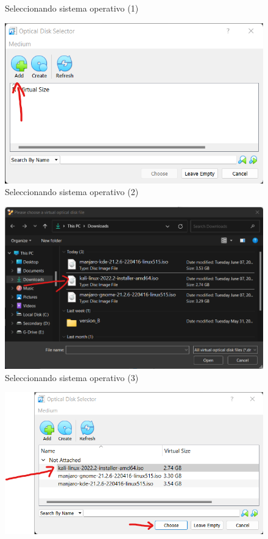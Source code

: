 \documentclass[stu, 12pt, letterpaper, donotrepeattitle, floatsintext, natbib, helv]{apa7}
\begin{document}
\begin{enumerate}
\begin{figure} [H]
        \caption{Seleccionando sistema operativo (1)}
        \label{fig:Select1}
    \end{figure}
    \begin{figure} [H]
        \includegraphics[width = 1\textwidth]{SelectingISO2.png}
        \caption{Seleccionando sistema operativo (2)}
        \label{fig:Select2}
    \end{figure}
    \begin{figure} [H]
        \includegraphics[width = 1\textwidth]{SelectingISO3.png}
        \caption{Seleccionando sistema operativo (3)}
        \label{fig:Select3}
    \end{figure}
    \begin{figure} [H]
        \includegraphics[width = 1\textwidth]{SelectingISO4.png}

\end{figure}
\end{enumerate}
\end{document}

